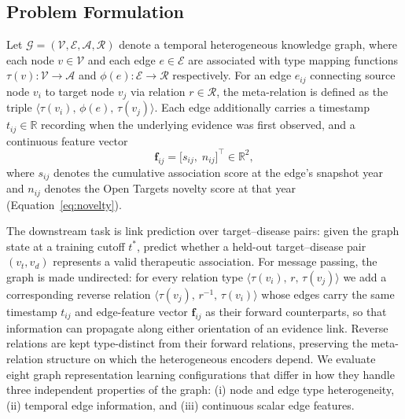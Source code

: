 \documentclass[a4,center]{NAR}
\begin{document}
{%
\subsection{Problem Formulation}
\label{sec:formulation}

Let $\mathcal{G} = (\mathcal{V}, \mathcal{E}, \mathcal{A}, \mathcal{R})$ denote
a temporal heterogeneous knowledge graph, where each node $v \in \mathcal{V}$
and each edge $e \in \mathcal{E}$ are associated with type mapping functions
$\tau(v) : \mathcal{V} \rightarrow \mathcal{A}$ and
$\phi(e) : \mathcal{E} \rightarrow \mathcal{R}$ respectively. For an edge
$e_{ij}$ connecting source node $v_i$ to target node $v_j$ via relation
$r \in \mathcal{R}$, the meta-relation is defined as the triple
$\langle \tau(v_i),\, \phi(e),\, \tau(v_j) \rangle$. Each edge additionally
carries a timestamp $t_{ij} \in \mathbb{R}$ recording when the underlying
evidence was first observed, and a continuous feature vector
\begin{equation}
    \mathbf{f}_{ij} = \bigl[s_{ij},\; n_{ij}\bigr]^\top \in \mathbb{R}^2,
\end{equation}
where $s_{ij}$ denotes the cumulative association score at the edge's
snapshot year and $n_{ij}$ denotes the Open Targets novelty score at that
year (Equation~\eqref{eq:novelty}).

The downstream task is link prediction over target--disease pairs: given the
graph state at a training cutoff $t^*$, predict whether a held-out
target--disease pair $(v_t, v_d)$ represents a valid therapeutic association.
For message passing, the graph is made undirected: for every relation type
$\langle \tau(v_i),\, r,\, \tau(v_j) \rangle$ we add a corresponding reverse
relation $\langle \tau(v_j),\, r^{-1},\, \tau(v_i) \rangle$ whose edges carry
the same timestamp $t_{ij}$ and edge-feature vector $\mathbf{f}_{ij}$ as their
forward counterparts, so that information can propagate along either
orientation of an evidence link. Reverse relations are kept type-distinct from
their forward relations, preserving the meta-relation structure on which the
heterogeneous encoders depend. We evaluate eight graph representation learning
configurations that differ in how they handle three independent properties of
the graph: (i) node and edge type heterogeneity, (ii) temporal edge
information, and (iii) continuous scalar edge features.


}
\end{document}
